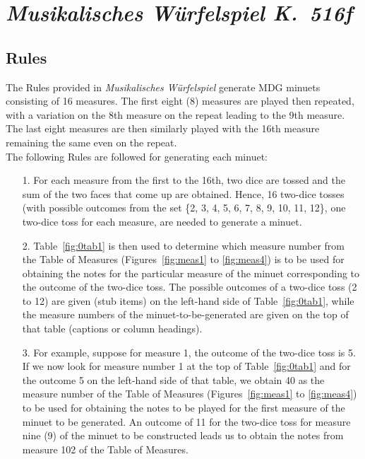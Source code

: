 \documentclass[letterpaper,x11names,svgnames,10pt]{article}
\begin{document}
\section{\em Musikalisches W\"{u}rfelspiel K.\ 516f}

\subsection{Rules}

The Rules provided in {\em Musikalisches W\"{u}rfelspiel} generate MDG minuets consisting of 16 measures.  The first eight (8) measures are played then repeated, with a variation on the 8th measure on the repeat leading to the 9th measure.  The last eight measures are then similarly played with the 16th measure remaining the same even on the repeat. \\

The following Rules are followed for generating each minuet:
\begin{enumerate}
	\item [1.] For each measure from the first to the 16th, two dice are tossed and the sum of the two faces that come up are obtained.  Hence, 16 two-dice tosses (with possible outcomes from the set \{2, 3, 4, 5, 6, 7, 8, 9, 10, 11, 12\}, one two-dice toss for each measure, are needed to generate a minuet.   
	\item [2.] Table~\ref{fig:0tab1} is then used to determine which measure number from the Table of Measures (Figures~\ref{fig:meas1} to \ref{fig:meas4}) is to be used for obtaining the notes for the particular measure of the minuet corresponding to the outcome of the two-dice toss.  The possible outcomes of a two-dice toss (2 to 12) are given (stub items) on the left-hand side of Table~\ref{fig:0tab1}, while the measure numbers of the minuet-to-be-generated are given on the top of that table (captions or column  headings).
	\item [3.]  For example, suppose for measure 1, the outcome of the two-dice toss is 5.  If we now look for measure number 1 at the top of Table~\ref{fig:0tab1} and for the outcome 5 on the left-hand side of that table, we obtain 40 as the measure number of the Table of Measures (Figures~\ref{fig:meas1} to \ref{fig:meas4}) to be used for obtaining the notes to be played for the first measure of the minuet to be generated.  An outcome of 11 for the two-dice toss for measure nine (9) of the minuet to be constructed leads us to obtain the notes from measure 102 of the Table of Measures.
\end{enumerate}   
\end{document}
